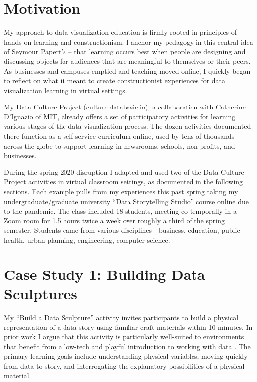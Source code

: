 \documentclass[journal]{vgtc}                %
\begin{document}
\section{Motivation}
My approach to data visualization education is firmly rooted in principles of hands-on learning and constructionism\cite{dignazio_creative_2018}. I anchor my pedagogy in this central idea of Seymour Papert’s – that learning occurs best when people are designing and discussing objects for audiences that are meaningful to themselves or their peers\cite{papert_childrens_1994}. As businesses and campuses emptied and teaching moved online, I quickly began to reflect on what it meant to create constructionist experiences for data visualization learning in virtual settings.

My Data Culture Project (\href{http://culture.databasic.io}{culture.databasic.io}), a collaboration with Catherine D’Ignazio of MIT, already offers a  set of participatory activities for learning various stages of the data visualization process. The dozen activities documented there function as a self-service curriculum online, used by tens of thousands across the globe to support learning in newsrooms, schools, non-profits, and businesses. 

During the spring 2020 disruption I adapted and used two of the Data Culture Project activities in virtual classroom settings, as documented in the following sections. Each example pulls from my experiences this past spring taking my undergraduate/graduate university “Data Storytelling Studio” course online due to the pandemic. The class included 18 students, meeting co-temporally in a Zoom room for 1.5 hours twice a week over roughly a third of the spring semester. Students came from various disciplines - business, education, public health, urban planning, engineering, computer science.

\section{Case Study 1: Building Data Sculptures}
My “Build a Data Sculpture” activity invites participants to build a physical representation of a data story using familiar craft materials within 10 minutes. In prior work I argue that this activity is particularly well-suited to environments that benefit from a low-tech and playful introduction to working with data \cite{bhargava_data_2017}. The primary learning goals include understanding physical variables, moving quickly from data to story, and interrogating the explanatory possibilities of a physical material.
\end{document}

